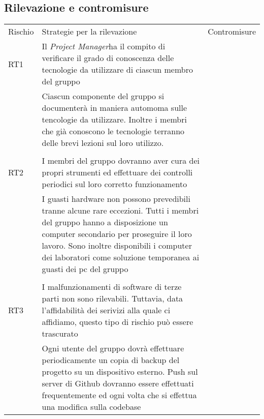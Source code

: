 \subsection{Rilevazione e contromisure}

\begin{table}[H]
	\centering
	\begin{tabular}{l|l|l}
		Rischio & Strategie per la rilevazione  & Contromisure  \\
		RT1     & Il \emph{Project Manager}ha il compito di verificare il grado di conoscenza delle tecnologie da utilizzare di ciascun membro del gruppo\\                                                                                           & Ciascun componente del gruppo si documenterà in maniera automoma sulle tencologie da utilizzare. Inoltre i membri che già conoscono le tecnologie terranno delle brevi lezioni sul loro utilizzo.\\                                                                                                                                                                                                                                                                                  \\
		RT2     & I membri del gruppo dovranno aver cura dei propri strumenti ed effettuare dei controlli periodici sul loro corretto funzionamento\\                                                                                                              & I guasti hardware non possono prevedibili tranne alcune rare eccezioni. Tutti i membri del gruppo hanno a disposizione un computer secondario per proseguire il loro lavoro. Sono inoltre disponibili i computer dei laboratori come soluzione temporanea ai guasti dei pc del gruppo\\                                                                                                                                                                                             \\
		RT3     & I malfunzionamenti di software di terze parti non sono rilevabili. Tuttavia, data l'affidabilità dei serivizi alla quale ci affidiamo, questo tipo di rischio può essere trascurato\\                                                            & Ogni utente del gruppo dovrà effettuare periodicamente un copia di backup del progetto su un dispositivo esterno. Push sul server di Github dovranno essere effettuati frequentemente ed ogni volta che si effettua una modifica sulla codebase                                                                                                                                                                                                                                      \\

\end{tabular}
\end{table}
